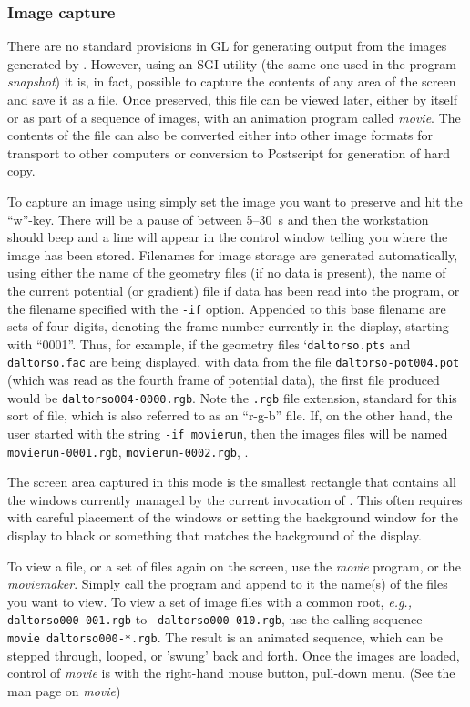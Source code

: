 \subsubsection{Image capture}
\label{sec:capture}
 
There are no standard provisions in GL for generating output from the
images generated by \map{}.  However, using an SGI utility (the same one
used in the program {\em snapshot\/}) it is, in fact, possible to capture the
contents of any area of the screen and save it as a file.  Once preserved,
this file can be viewed later, either by itself or as part of a sequence of
images, with an animation program called {\em movie\/}. The contents of the
file can also be converted either into other image formats for transport to
other computers or conversion to Postscript for generation of hard
copy.

To capture an image using \map{} simply set the image you want to preserve
and hit the ``w''-key. There will be a pause of between 5--30~s and then
the workstation should beep and a line will appear in the control window
telling you where the image has been stored.  Filenames for image storage
are generated automatically, using either the name of the geometry files
(if no data is present), the name of the current potential (or gradient)
file if data has been read into the program, or the filename specified with
the {\tt -if} option. Appended to this base filename
are sets of four digits, denoting the frame number currently in
the display, starting with ``0001''.  Thus, for
example, if the geometry files `{\tt daltorso.pts} and {\tt daltorso.fac}
are being displayed, with data from the file {\tt daltorso-pot004.pot}
(which was read as the fourth frame of potential data), the first file
produced would be {\tt daltorso004-0000.rgb}.  Note the {\tt .rgb} file
extension, standard for this sort of file, which is also referred to as an
``r-g-b'' file.  If, on the other hand, the user started \map{} with the
string {\tt -if movierun}, then the images files will be named {\tt
movierun-0001.rgb}, {\tt movierun-0002.rgb}, \etc{}.

The screen area captured in this mode is the smallest rectangle that
contains all the windows currently managed by the current invocation of
\map{}.  This often requires with careful placement of the windows or
setting the background window for the display to black or something that
matches the background of the \map{} display.

To view a file, or a set of files again on the screen, use the {\em movie}
program, or the {\em moviemaker}. Simply call the program and append to it
the name(s) of the files you want to view. To view a set of image files
with a common root, {\em e.g.,} {\tt daltorso000-001.rgb} to {\tt
daltorso000-010.rgb}, use the calling sequence {\tt
movie~daltorso000-*.rgb}.  The result is an animated sequence, which can be
stepped through, looped, or 'swung' back and forth. Once the images are
loaded, control of {\em movie\/} is with the right-hand mouse button,
pull-down menu.  (See the man page on {\em movie\/})

